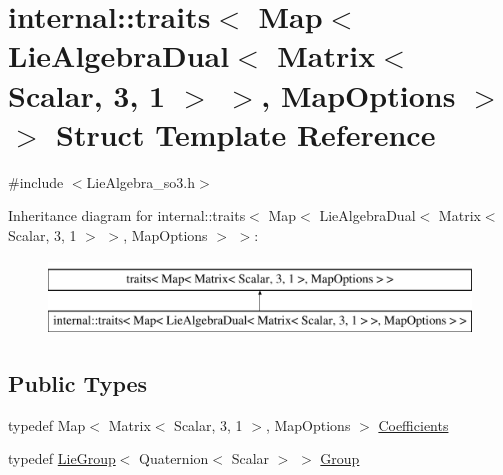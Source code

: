 \hypertarget{structinternal_1_1traits_3_01_map_3_01_lie_algebra_dual_3_01_matrix_3_01_scalar_00_013_00_011_01e8a24fa295b52ac8e6af43d3afd0f30d}{}\section{internal\+:\+:traits$<$ Map$<$ Lie\+Algebra\+Dual$<$ Matrix$<$ Scalar, 3, 1 $>$ $>$, Map\+Options $>$ $>$ Struct Template Reference}
\label{structinternal_1_1traits_3_01_map_3_01_lie_algebra_dual_3_01_matrix_3_01_scalar_00_013_00_011_01e8a24fa295b52ac8e6af43d3afd0f30d}


{\ttfamily \#include $<$Lie\+Algebra\+\_\+so3.\+h$>$}

Inheritance diagram for internal\+:\+:traits$<$ Map$<$ Lie\+Algebra\+Dual$<$ Matrix$<$ Scalar, 3, 1 $>$ $>$, Map\+Options $>$ $>$\+:\begin{figure}[H]
\begin{center}
\leavevmode
\includegraphics[height=2.000000cm]{structinternal_1_1traits_3_01_map_3_01_lie_algebra_dual_3_01_matrix_3_01_scalar_00_013_00_011_01e8a24fa295b52ac8e6af43d3afd0f30d}
\end{center}
\end{figure}
\subsection*{Public Types}
\begin{DoxyCompactItemize}
\item 
typedef Map$<$ Matrix$<$ Scalar, 3, 1 $>$, Map\+Options $>$ \hyperlink{structinternal_1_1traits_3_01_map_3_01_lie_algebra_dual_3_01_matrix_3_01_scalar_00_013_00_011_01e8a24fa295b52ac8e6af43d3afd0f30d_ab5f11b84b668c4441e8bc5864fd37e84}{Coefficients}
\item 
typedef \hyperlink{class_lie_group}{Lie\+Group}$<$ Quaternion$<$ Scalar $>$ $>$ \hyperlink{structinternal_1_1traits_3_01_map_3_01_lie_algebra_dual_3_01_matrix_3_01_scalar_00_013_00_011_01e8a24fa295b52ac8e6af43d3afd0f30d_a9922d6f6d1e181a21318ebee9de891d2}{Group}
\end{DoxyCompactItemize}


